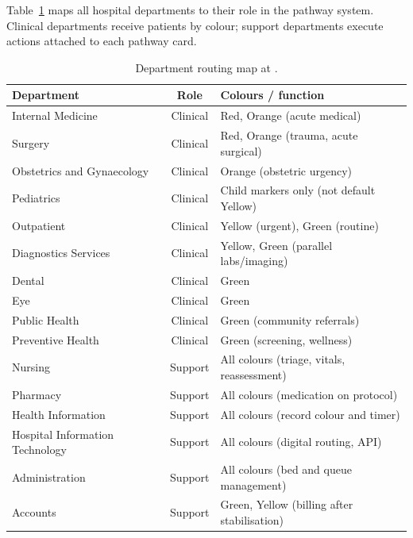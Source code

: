 Table~\ref{tab:knust-dept-routing} maps all hospital departments to their role in the pathway system. Clinical departments receive patients by colour; support departments execute actions attached to each pathway card.

\begin{table}[H]
\centering
\scriptsize
\begin{tabular}{|p{3.4cm}|c|p{4.8cm}|}
\hline
\textbf{Department} & \textbf{Role} & \textbf{Colours / function} \\
\hline
Internal Medicine & Clinical & Red, Orange (acute medical) \\
Surgery & Clinical & Red, Orange (trauma, acute surgical) \\
Obstetrics and Gynaecology & Clinical & Orange (obstetric urgency) \\
Pediatrics & Clinical & Child markers only (not default Yellow) \\
Outpatient & Clinical & Yellow (urgent), Green (routine) \\
Diagnostics Services & Clinical & Yellow, Green (parallel labs/imaging) \\
Dental & Clinical & Green \\
Eye & Clinical & Green \\
Public Health & Clinical & Green (community referrals) \\
Preventive Health & Clinical & Green (screening, wellness) \\
Nursing & Support & All colours (triage, vitals, reassessment) \\
Pharmacy & Support & All colours (medication on protocol) \\
Health Information & Support & All colours (record colour and timer) \\
Hospital Information Technology & Support & All colours (digital routing, API) \\
Administration & Support & All colours (bed and queue management) \\
Accounts & Support & Green, Yellow (billing after stabilisation) \\
\hline
\end{tabular}
\caption{Department routing map at \examplehospital{}.}
\label{tab:knust-dept-routing}
\end{table}

